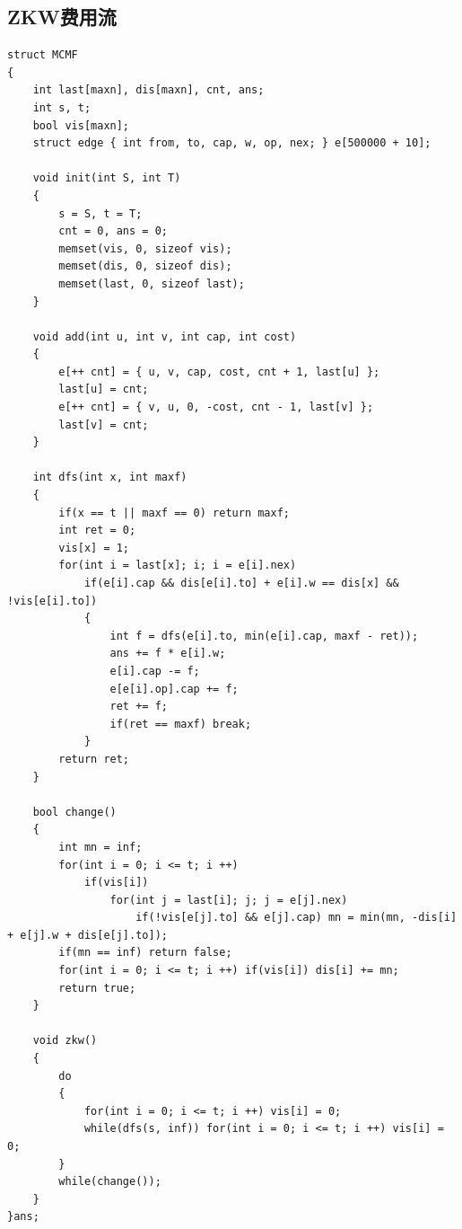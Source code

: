 \documentclass[twoside]{article}
\begin{document}
\subsection{ZKW费用流}
\begin{lstlisting}
struct MCMF
{
    int last[maxn], dis[maxn], cnt, ans;
    int s, t;
    bool vis[maxn];
    struct edge { int from, to, cap, w, op, nex; } e[500000 + 10];
 
    void init(int S, int T)
    {
        s = S, t = T;
        cnt = 0, ans = 0;
        memset(vis, 0, sizeof vis);
        memset(dis, 0, sizeof dis);
        memset(last, 0, sizeof last);
    }
 
    void add(int u, int v, int cap, int cost)
    {
        e[++ cnt] = { u, v, cap, cost, cnt + 1, last[u] };
        last[u] = cnt;
        e[++ cnt] = { v, u, 0, -cost, cnt - 1, last[v] };
        last[v] = cnt;
    }
 
    int dfs(int x, int maxf)
    {
        if(x == t || maxf == 0) return maxf;
        int ret = 0;
        vis[x] = 1;
        for(int i = last[x]; i; i = e[i].nex)
            if(e[i].cap && dis[e[i].to] + e[i].w == dis[x] && !vis[e[i].to])
            {
                int f = dfs(e[i].to, min(e[i].cap, maxf - ret));
                ans += f * e[i].w;
                e[i].cap -= f;
                e[e[i].op].cap += f;
                ret += f;
                if(ret == maxf) break;
            }
        return ret;
    }
 
    bool change()
    {
        int mn = inf;
        for(int i = 0; i <= t; i ++)
            if(vis[i])
                for(int j = last[i]; j; j = e[j].nex)
                    if(!vis[e[j].to] && e[j].cap) mn = min(mn, -dis[i] + e[j].w + dis[e[j].to]);
        if(mn == inf) return false;
        for(int i = 0; i <= t; i ++) if(vis[i]) dis[i] += mn;
        return true;
    }
 
    void zkw()
    {
        do
        {
            for(int i = 0; i <= t; i ++) vis[i] = 0;
            while(dfs(s, inf)) for(int i = 0; i <= t; i ++) vis[i] = 0;
        }
        while(change());
    }
}ans;
\end{lstlisting}
\end{document}
